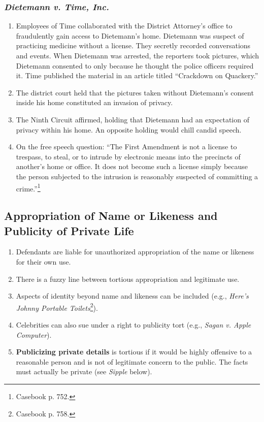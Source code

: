 \subsubsection{\emph{Dietemann v. Time, Inc.}}

\begin{enumerate}
    \item Employees of Time collaborated with the District Attorney's office 
    to fraudulently gain access to Dietemann's home. Dietemann was suspect of 
    practicing medicine without a license. They secretly recorded 
    conversations and events. When Dietemann was arrested, the reporters took 
    pictures, which Dietemann consented to only because he thought the police 
    officers required it. Time published the material in an article titled 
    ``Crackdown on Quackery.''
    \item The district court held that the pictures taken without Dietemann's 
    consent inside his home constituted an invasion of privacy.
    \item The Ninth Circuit affirmed, holding that Dietemann had an 
    expectation of privacy within his home. An opposite holding would chill 
    candid speech.
    \item On the free speech question: ``The First Amendment is not a license 
    to trespass, to steal, or to intrude by electronic means into the 
    precincts of another's home or office. It does not become such a license 
    simply because the person subjected to the intrusion is reasonably 
    suspected of committing a crime.''\footnote{Casebook p. 752.}
\end{enumerate}

\subsection{Appropriation of Name or Likeness and Publicity of Private Life}

\begin{enumerate}
    \item Defendants are liable for unauthorized appropriation of the name or 
    likeness for their own use.
    \item There is a fuzzy line between tortious appropriation and legitimate 
    use.
    \item Aspects of identity beyond name and likeness can be included (e.g., 
    \emph{Here's Johnny Portable Toilets}\footnote{Casebook p. 758.}).
    \item Celebrities can also sue under a right to publicity tort (e.g., 
    \emph{Sagan v. Apple Computer}).
    \item \textbf{Publicizing private details} is tortious if it would be highly 
    offensive to a reasonable person and is not of legitimate concern to the 
    public. The facts must actually be private (see \emph{Sipple} below).
\end{enumerate}

